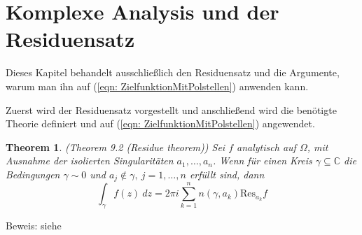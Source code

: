 \documentclass[a4paper,12pt]{report}
\newcommand{\C}{\mathbb C}
\newcommand{\1}{\mathds{1}}
\newcommand{\Res}{\text{Res}}
\theoremstyle{plain} %
\newtheorem{theorem}{Theorem}
\theoremstyle{definition} %
\theoremstyle{remark}
\begin{document}
      \section{Komplexe Analysis und der Residuensatz}
            Dieses Kapitel behandelt ausschließlich den Residuensatz und die Argumente, warum man ihn auf (\ref{eqn: ZielfunktionMitPolstellen}) anwenden kann.
            
            Zuerst wird der Residuensatz vorgestellt und anschließend wird die benötigte Theorie definiert und auf (\ref{eqn: ZielfunktionMitPolstellen}) angewendet.

            \begin{theorem}(Theorem 9.2 (Residue theorem)\cite[S. 141]{complexAnalysis})
                  \label{thrm: Residuensatz}
                  Sei $f$ analytisch auf $\Omega$, mit Ausnahme der isolierten Singularitäten $a_1,\dots,a_n$. Wenn für einen Kreis $\gamma\subseteq\C$ die Bedingungen $\gamma \sim 0$ und $a_j\notin \gamma,\ j=1,\dots,n$ erfüllt sind, dann
                  $$\int_\gamma f(z)\ dz = 2\pi i\sum_{k=1}^{n} n(\gamma, a_k)\Res_{a_k}f$$
            \end{theorem}
            Beweis: siehe \cite[S. 142]{complexAnalysis}
\end{document}
